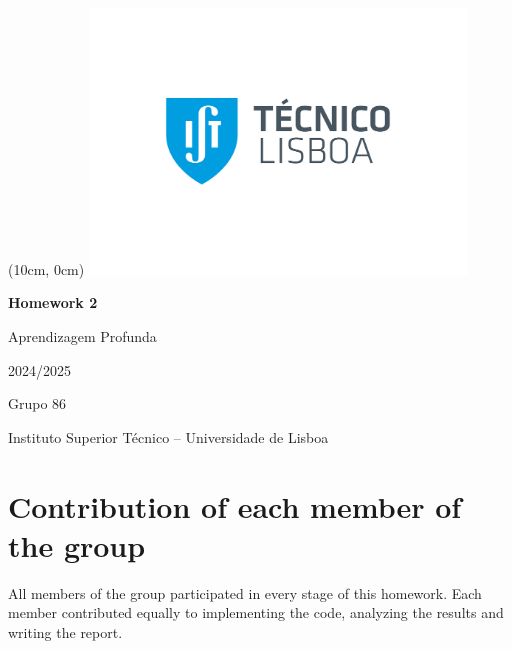 \documentclass[12pt,a4paper]{article}
\newcommand{\reporttitle}{Homework 2}
\newcommand{\authorgroup}{Grupo 86}
\newcommand{\istul}{Instituto Superior Técnico -- Universidade de Lisboa}
\newcommand{\reportcourse}{Aprendizagem Profunda}
\newcommand{\reportyear}{2024/2025}
\begin{document}
    \begin{titlepage}

        \begin{textblock*}{0cm}(10cm, 0cm)
            \includegraphics[width=10cm]{Logo IST.jpg}
        \end{textblock*}

        \centering
        \vspace*{5cm}
        {\Huge \textbf{\reporttitle} \par}

        \vspace{0.5cm}
        {\LARGE \reportcourse \par}

        \vspace{0.5cm}
        {\large \reportyear \par}

        \vspace{2cm}
        {\large \authorgroup \par}
        
        \vspace{0.25cm}
        {\large \istul \par}

        \vfill
        \renewcommand{\contentsname}{Índice}
        \tableofcontents

        \thispagestyle{empty}
        \clearpage

    \end{titlepage}

    \section*{Contribution of each member of the group}
    All members of the group participated in every stage of this homework. Each member contributed equally to implementing the code, analyzing the results and writing the report.
\end{document}
